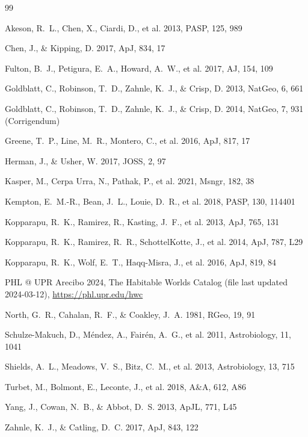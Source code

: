 \documentclass[linenumbers]{aastex702}
\begin{document}
\begin{thebibliography}{99}

 Akeson, R.~L., Chen, X., Ciardi, D., et al. 2013, PASP, 125, 989

 Chen, J., \& Kipping, D. 2017, ApJ, 834, 17

 Fulton, B.~J., Petigura, E.~A., Howard, A.~W., et al. 2017, AJ, 154, 109

 Goldblatt, C., Robinson, T.~D., Zahnle, K.~J., \& Crisp, D. 2013, NatGeo, 6, 661

 Goldblatt, C., Robinson, T.~D., Zahnle, K.~J., \& Crisp, D. 2014, NatGeo, 7, 931 (Corrigendum)

 Greene, T.~P., Line, M.~R., Montero, C., et al. 2016, ApJ, 817, 17

 Herman, J., \& Usher, W. 2017, JOSS, 2, 97

 Kasper, M., Cerpa Urra, N., Pathak, P., et al. 2021, Msngr, 182, 38

 Kempton, E.~M.-R., Bean, J.~L., Louie, D.~R., et al. 2018, PASP, 130, 114401

 Kopparapu, R.~K., Ramirez, R., Kasting, J.~F., et al. 2013, ApJ, 765, 131

 Kopparapu, R.~K., Ramirez, R.~R., SchottelKotte, J., et al. 2014, ApJ, 787, L29

 Kopparapu, R.~K., Wolf, E.~T., Haqq-Misra, J., et al. 2016, ApJ, 819, 84

 PHL @ UPR Arecibo 2024, The Habitable Worlds Catalog (file last updated 2024-03-12), \url{https://phl.upr.edu/hwc}

 North, G.~R., Cahalan, R.~F., \& Coakley, J.~A. 1981, RGeo, 19, 91

 Schulze-Makuch, D., M\'endez, A., Fair\'en, A.~G., et al. 2011, Astrobiology, 11, 1041

 Shields, A.~L., Meadows, V.~S., Bitz, C.~M., et al. 2013, Astrobiology, 13, 715

 Turbet, M., Bolmont, E., Leconte, J., et al. 2018, A\&A, 612, A86

 Yang, J., Cowan, N.~B., \& Abbot, D.~S. 2013, ApJL, 771, L45

 Zahnle, K.~J., \& Catling, D.~C. 2017, ApJ, 843, 122

\end{thebibliography}
\end{document}

